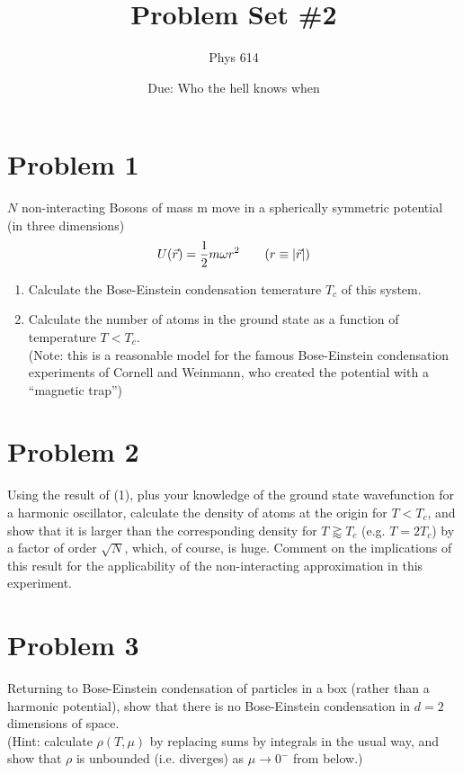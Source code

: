 \documentclass[12pt]{article}
\begin{document}
\title{Problem Set \#2}
\author{Phys 614}
\date{Due: Who the hell knows when}
\maketitle

\section*{Problem 1}
$N$ non-interacting Bosons of mass m move in a spherically symmetric potential (in three dimensions)
\begin{equation}
    U(\vec{r}) = \frac{1}{2}m\omega r^2 \qquad ( r \equiv \abs{\vec{r}})
\end{equation}
\begin{enumerate}[label=\Alph*)]
    \item Calculate the Bose-Einstein condensation temerature $T_c$ of this system.
    \item Calculate the number of atoms in the ground state as a function of temperature $T < T_c$. \\ (Note: this is a reasonable model for the famous Bose-Einstein condensation experiments of Cornell and Weinmann, who created the potential with a ``magnetic trap'')
\end{enumerate}

\section*{Problem 2}
Using the result of (1), plus your knowledge of the ground state wavefunction for a harmonic oscillator, calculate the density of atoms at the origin for $T < T_c$, and show that it is larger than the corresponding density for $T \gtrapprox T_c$ (e.g. $T = 2T_c$) by a factor of order $\sqrt{N}$, which, of course, is huge. Comment on the implications of this result for the applicability of the non-interacting approximation in this experiment.

\section*{Problem 3}
Returning to Bose-Einstein condensation of particles in a box (rather than a harmonic potential), show that there is no Bose-Einstein condensation in $d=2$ dimensions of space. \\ (Hint: calculate $\rho(T, \mu)$ by replacing sums by integrals in the usual way, and show that $\rho$ is unbounded (i.e. diverges) as $\mu \to 0^-$ from below.)
\end{document}
